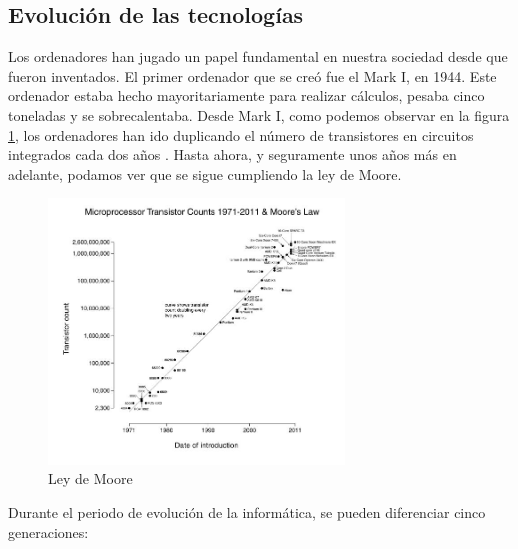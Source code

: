 \documentclass[twoside, titlepage, 12pt, a4paper]{article}
\begin{document}
\subsection{Evolución de las tecnologías}
Los ordenadores han jugado un papel fundamental en nuestra sociedad desde que fueron inventados. El primer ordenador que se creó fue el Mark I, en 1944. Este ordenador estaba hecho mayoritariamente para realizar cálculos, pesaba cinco toneladas y se sobrecalentaba.
Desde Mark I, como podemos observar en la figura \ref{fig:moore}, los ordenadores han ido duplicando el número de transistores en circuitos integrados cada dos años \cite{moore}. Hasta ahora, y seguramente unos años más en adelante, podamos ver que se sigue cumpliendo la ley de Moore.
\begin{figure}[H]
    \centering
    \includegraphics[width=0.7\textwidth]{Media/moore.jpg}
    \caption{Ley de Moore}
    \label{fig:moore}
\end{figure}
Durante el periodo de evolución de la informática, se pueden diferenciar cinco generaciones:
\end{document}
